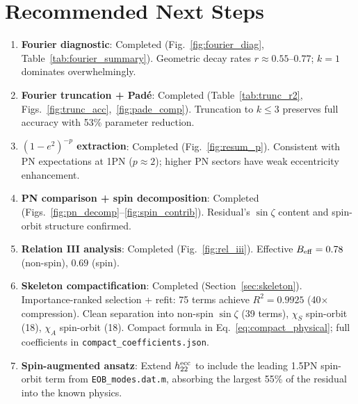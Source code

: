 \documentclass[11pt,letterpaper]{article}
\newcommand{\chiS}{\chi_S}
\newcommand{\chiA}{\chi_A}
\begin{document}
\section{Recommended Next Steps}
\label{sec:next}

\begin{enumerate}[nosep]
\item[\checkmark] \textbf{Fourier diagnostic}: Completed (Fig.~\ref{fig:fourier_diag}, Table~\ref{tab:fourier_summary}). Geometric decay rates $r \approx 0.55$--$0.77$; $k = 1$ dominates overwhelmingly.

\item[\checkmark] \textbf{Fourier truncation + Pad\'e}: Completed (Table~\ref{tab:trunc_r2}, Figs.~\ref{fig:trunc_acc},~\ref{fig:pade_comp}). Truncation to $k \leq 3$ preserves full accuracy with 53\% parameter reduction.

\item[\checkmark] \textbf{$(1-e^2)^{-p}$ extraction}: Completed (Fig.~\ref{fig:resum_p}). Consistent with PN expectations at 1PN ($p \approx 2$); higher PN sectors have weak eccentricity enhancement.

\item[\checkmark] \textbf{PN comparison + spin decomposition}: Completed (Figs.~\ref{fig:pn_decomp}--\ref{fig:spin_contrib}). Residual's $\sin\zeta$ content and spin-orbit structure confirmed.

\item[\checkmark] \textbf{Relation III analysis}: Completed (Fig.~\ref{fig:rel_iii}). Effective $B_{\rm eff} = 0.78$ (non-spin), $0.69$ (spin).

\item[\checkmark] \textbf{Skeleton compactification}: Completed (Section~\ref{sec:skeleton}). Importance-ranked selection + refit: 75 terms achieve $R^2 = 0.9925$ (40$\times$ compression). Clean separation into non-spin $\sin\zeta$ (39 terms), $\chiS$ spin-orbit (18), $\chiA$ spin-orbit (18). Compact formula in Eq.~\eqref{eq:compact_physical}; full coefficients in \texttt{compact\_coefficients.json}.

\item[$\circ$] \textbf{Spin-augmented ansatz}: Extend $h_{22}^{\rm ecc}$ to include the leading 1.5PN spin-orbit term from \texttt{EOB\_modes.dat.m}, absorbing the largest 55\% of the residual into the known physics.


\end{enumerate}
\end{document}
